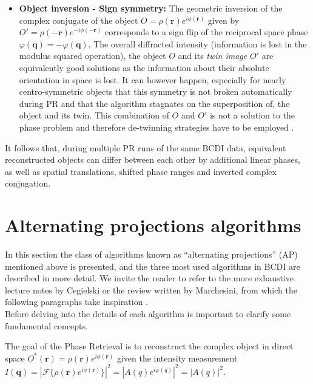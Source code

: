 \begin{itemize}
    \item \textbf{Object inversion - Sign symmetry:} The geometric inversion of the complex conjugate of the object 
    $ O = \rho(\mathbf{r})e^{i\phi({\mathbf{r}})}$ given by $O' = \rho(\mathbf{-r})e^{-i\phi({\mathbf{-r}})}$ corresponds to a 
    sign flip of the reciprocal space phase $\varphi(\mathbf{q}) = -\varphi(\mathbf{q})$. The overall diffracted intensity 
    (information is lost in the modulus squared operation), the object $O$ 
    and its \textit{twin image} $O'$ are equivalently good solutions as the information about their absolute orientation 
    in space is lost. It can however happen, especially for nearly centro-symmetric objects 
    that this symmetry is not broken automatically during PR and that the algorithm stagnates on the superposition of, 
    the object and its twin. This combination of $O$ and $ O'$ is not a solution to the phase problem \cite{guizar-sicairos_understanding_2012} 
    and therefore de-twinning strategies have to be employed \cite{Gaur2015}. 
    
\end{itemize}

It follows that, during multiple PR runs of the same BCDI data, equivalent reconstructed objects can differ between each 
other by additional linear phases, as well as spatial translations, shifted phase ranges and inverted complex conjugation. 


\section{Alternating projections algorithms}

In this section the class of algorithms known as ``alternating projections'' (AP) mentioned above is presented, and the three most 
used algorithms in BCDI are described in more detail. We invite the reader to refer to the more exhaustive lecture notes by 
Cegielski \cite{book_iterative2012} or the review written by Marchesini, from which the following paragraphs take 
inspiration \cite{marchesini_unified_2007} .\\

Before delving into the details of each algorithm is important to clarify some fundamental concepts.

The goal of the Phase Retrieval is to reconstruct the complex object in direct space $O^{\ast}(\mathbf{r}) = \rho(\mathbf{r})e^{i\phi(\mathbf{r})}$
given the intensity measurement $I(\mathbf{q}) = |\mathcal{F}\{\rho(\mathbf{r})e^{i\phi(\mathbf{r})}\}|^2 = |A(q)e^{i\varphi(q)}|^2 = |A(q)|^2 $. 

